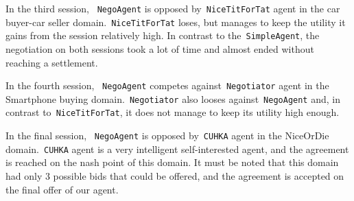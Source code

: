 \documentclass[html]{report}    %
\begin{document}
In the third session, ~\texttt{NegoAgent} is opposed by~\texttt{NiceTitForTat} agent in the car buyer-car seller domain.~\texttt{NiceTitForTat} loses, but manages to keep the utility it gains from the session relatively high. In contrast to the~\texttt{SimpleAgent}, the negotiation on both sessions took a lot of time and almost ended without reaching a settlement.

In the fourth session, ~\texttt{NegoAgent} competes against~\texttt{Negotiator} agent in the Smartphone buying domain.~\texttt{Negotiator} also looses against~\texttt{NegoAgent} and, in contrast to~\texttt{NiceTitForTat}, it does not manage to keep its utility high enough.

In the final session, ~\texttt{NegoAgent} is opposed by~\texttt{CUHKA} agent in the NiceOrDie domain.~\texttt{CUHKA} agent is a very intelligent self-interested agent, and the agreement is reached on the nash point of this domain. It must be noted that this domain had only 3 possible bids that could be offered, and the agreement is accepted on the final offer of our agent.
\end{document}
